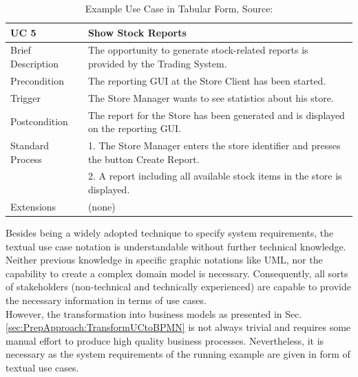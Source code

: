 \begin{table}[!h]
	\centering
	\begin{tabularx}{\textwidth}{|l||X|}
		\hline
		UC 5 & Show Stock Reports \\ 
		\hline
		Brief Description &  The opportunity to generate stock-related reports is provided
		by the Trading System. \\
		\hline
		Precondition & The reporting GUI at the Store Client has been started. \\
		\hline
		Trigger & The Store Manager wants to see statistics about his store. \\
		\hline
		Postcondition & The report for the Store has been generated and is displayed on
		the reporting GUI. \\
		\hline 
		Standard Process &
		
		1. The Store Manager enters the store identifier and presses the button Create
		Report.  \\
		& 2. A report including all available stock items in the store is displayed. \\  
		\hline
		Extensions & (none) \\ \hline
		
		
	\end{tabularx}
	\caption{Example Use Case in Tabular Form, Source: \cite{CoCoMEOld}}
	\label{tab:exampleUseCase}
	
\end{table}

\noindent
Besides being a widely adopted technique to specify system requirements, the textual use case notation is understandable without further technical knowledge. Neither previous knowledge in specific graphic notations like UML, nor the capability to create a complex domain model is necessary. Consequently, all sorts of stakeholders (non-technical and technically experienced) are capable to provide the necessary information in terms of use cases. \\
However, the transformation into business models as presented in Sec.\ref{sec:PrepApproach:TransformUCtoBPMN} is not always trivial and requires some manual effort to produce high quality business processes. Nevertheless, it is necessary as the system requirements of the running example are given in form of textual use cases.






